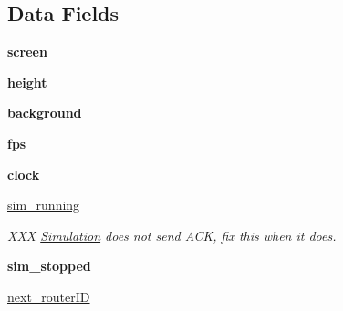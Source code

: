 \subsection*{Data Fields}
\begin{DoxyCompactItemize}
\item 
\hypertarget{classSimulationUI_1_1SimulationUI_a4fda6fc472ae147f5524c3f15f83496b}{{\bfseries screen}}\label{classSimulationUI_1_1SimulationUI_a4fda6fc472ae147f5524c3f15f83496b}

\item 
\hypertarget{classSimulationUI_1_1SimulationUI_a8939941008fcb34155f11ccfaec40477}{{\bfseries height}}\label{classSimulationUI_1_1SimulationUI_a8939941008fcb34155f11ccfaec40477}

\item 
\hypertarget{classSimulationUI_1_1SimulationUI_aca8e16e8f78aed43cff6be532d185ca3}{{\bfseries background}}\label{classSimulationUI_1_1SimulationUI_aca8e16e8f78aed43cff6be532d185ca3}

\item 
\hypertarget{classSimulationUI_1_1SimulationUI_a16b12b735c616ec96be05c7915e74c50}{{\bfseries fps}}\label{classSimulationUI_1_1SimulationUI_a16b12b735c616ec96be05c7915e74c50}

\item 
\hypertarget{classSimulationUI_1_1SimulationUI_aad7f2c8caad7a2cd4c38481f1398ab52}{{\bfseries clock}}\label{classSimulationUI_1_1SimulationUI_aad7f2c8caad7a2cd4c38481f1398ab52}

\item 
\hypertarget{classSimulationUI_1_1SimulationUI_aab1cc4dc7884260e60a88ef3d540338f}{\hyperlink{classSimulationUI_1_1SimulationUI_aab1cc4dc7884260e60a88ef3d540338f}{sim\-\_\-running}}\label{classSimulationUI_1_1SimulationUI_aab1cc4dc7884260e60a88ef3d540338f}

\begin{DoxyCompactList}\small\item\em X\-X\-X \hyperlink{classSimulation}{Simulation} does not send A\-C\-K, fix this when it does. \end{DoxyCompactList}\item 
\hypertarget{classSimulationUI_1_1SimulationUI_ad741765421c83f9b20d6661cf6feef56}{{\bfseries sim\-\_\-stopped}}\label{classSimulationUI_1_1SimulationUI_ad741765421c83f9b20d6661cf6feef56}

\item 
\hypertarget{classSimulationUI_1_1SimulationUI_a57218bb8802600db7ded0f7d563bb314}{\hyperlink{classSimulationUI_1_1SimulationUI_a57218bb8802600db7ded0f7d563bb314}{next\-\_\-router\-I\-D}}\label{classSimulationUI_1_1SimulationUI_a57218bb8802600db7ded0f7d563bb314}


\end{DoxyCompactItemize}
